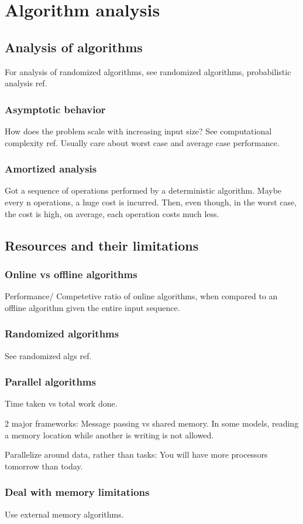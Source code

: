 \documentclass[oneside, article]{memoir}
\begin{document}
\part{Algorithm analysis}
\chapter{Analysis of algorithms}
For analysis of randomized algorithms, see randomized algorithms, probabilistic analysis ref.

\section{Asymptotic behavior}
How does the problem scale with increasing input size? See computational complexity ref. Usually care about worst case and average case performance.

\section{Amortized analysis}
Got a sequence of operations performed by a deterministic algorithm. Maybe every n operations, a huge cost is incurred. Then, even though, in the worst case, the cost is high, on average, each operation costs much less.


\chapter{Resources and their limitations}
\section{Online vs offline algorithms}
Performance/ Competetive ratio of online algorithms, when compared to an offline algorithm given the entire input sequence.

\section{Randomized algorithms}
See randomized algs ref.

\section{Parallel algorithms}
Time taken vs total work done.

2 major frameworks: Message passing vs shared memory. In some models, reading a memory location while another is writing is not allowed.

Parallelize around data, rather than tasks: You will have more processors tomorrow than today.

\section{Deal with memory limitations}
Use external memory algorithms. \tbc
\end{document}
